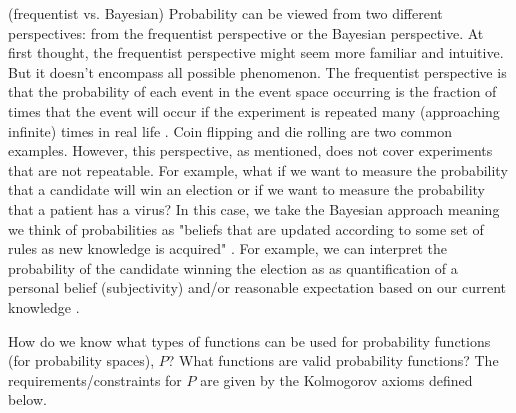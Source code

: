 \begin{remark}(frequentist vs. Bayesian)
Probability can be viewed from two different perspectives: from the frequentist perspective or the Bayesian perspective. At first thought, the frequentist perspective might seem more familiar and intuitive. But it doesn't encompass all possible phenomenon. The frequentist perspective is that the probability of each event in the event space occurring is the fraction of times that the event will occur if the experiment is repeated many (approaching infinite) times in real life \cite{math151notes}. Coin flipping and die rolling are two common examples. However, this perspective, as mentioned, does not cover experiments that are not repeatable. For example, what if we want to measure the probability that a candidate will win an election or if we want to measure the probability that a patient has a virus? In this case, we take the Bayesian approach meaning we think of probabilities as "beliefs that are updated according to some set of rules as new knowledge is acquired" \cite{math151notes}. For example, we can interpret the probability of the candidate winning the election as as quantification of a personal belief (subjectivity) and/or reasonable expectation based on our current knowledge \cite{enwiki:bayesianprobability}. 
\end{remark}

How do we know what types of functions can be used for probability functions (for probability spaces), $P$? What functions are valid probability functions? The requirements/constraints for $P$ are given by the Kolmogorov axioms defined below. 

